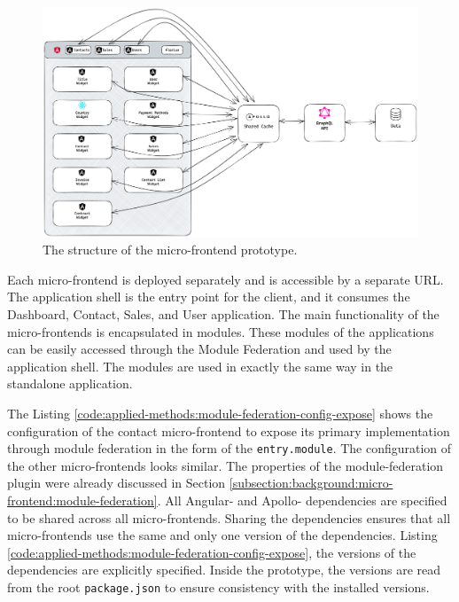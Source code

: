 \ifshowImages
\begin{figure}[H]
  \centering
  \includegraphics[width=1\linewidth]{images/applied-methods/prototypical-implementation/host-architecture.png}
  \caption{The structure of the micro-frontend prototype.}\label{fig:applied-methods:prototype-micro-frontend-architecture}
\end{figure}
\fi

\noindent Each micro-frontend is deployed separately and is accessible by a separate \ac{URL}. The application shell is the entry point for the client, and it consumes the Dashboard, Contact, Sales, and User application. The main functionality of the micro-frontends is encapsulated in modules. These modules of the applications can be easily accessed through the Module Federation and used by the application shell. The modules are used in exactly the same way in the standalone application.

\bigskip

\noindent The Listing \ref{code:applied-methods:module-federation-config-expose} shows the configuration of the contact micro-frontend to expose its primary implementation through module federation in the form of the \texttt{entry.module}. The configuration of the other micro-frontends looks similar. The properties of the module-federation plugin were already discussed in Section \ref{subsection:background:micro-frontend:module-federation}. All Angular- and Apollo- dependencies are specified to be shared across all micro-frontends. Sharing the dependencies ensures that all micro-frontends use the same and only one version of the dependencies. Listing \ref{code:applied-methods:module-federation-config-expose}, the versions of the dependencies are explicitly specified. Inside the prototype, the versions are read from the root \texttt{package.json} to ensure consistency with the installed versions.

